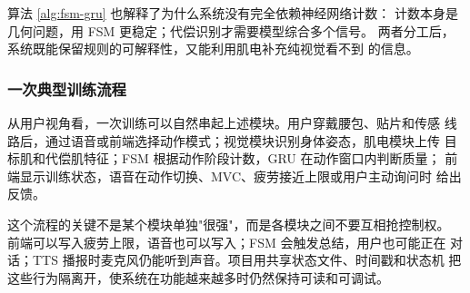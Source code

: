 算法 \ref{alg:fsm-gru} 也解释了为什么系统没有完全依赖神经网络计数：
计数本身是几何问题，用 FSM 更稳定；代偿识别才需要模型综合多个信号。
两者分工后，系统既能保留规则的可解释性，又能利用肌电补充纯视觉看不到
的信息。

\subsubsection{一次典型训练流程}

从用户视角看，一次训练可以自然串起上述模块。用户穿戴腰包、贴片和传感
线路后，通过语音或前端选择动作模式；视觉模块识别身体姿态，肌电模块上传
目标肌和代偿肌特征；FSM 根据动作阶段计数，GRU 在动作窗口内判断质量；
前端显示训练状态，语音在动作切换、MVC、疲劳接近上限或用户主动询问时
给出反馈。

这个流程的关键不是某个模块单独"很强"，而是各模块之间不要互相抢控制权。
前端可以写入疲劳上限，语音也可以写入；FSM 会触发总结，用户也可能正在
对话；TTS 播报时麦克风仍能听到声音。项目用共享状态文件、时间戳和状态机
把这些行为隔离开，使系统在功能越来越多时仍然保持可读和可调试。

